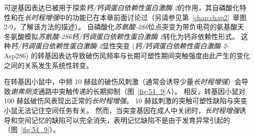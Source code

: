 可逆基因表达已被用于探索\textit{钙/钙调蛋白依赖性蛋白激酶 2}的作用，其自磷酸化特性和在\textit{长时程增强}中的功能已在本章前面讨论过（另请参见第~\ref{chap:chap2}~章图 2-9，了解该方法的描述）。
自磷酸化\textit{苏氨酸-286}位点突变为带负电荷的氨基酸天冬氨酸模拟\textit{苏氨酸-286}\textit{钙/钙调蛋白依赖性蛋白激酶 2}转化为钙非依赖性形式。
这种\textit{钙/钙调蛋白依赖性蛋白激酶 2}显性突变 (\textit{钙/钙调蛋白依赖性蛋白激酶 2}-Asp286) 的转基因表达导致破伤风频率与长期可塑性期间突触强度由此产生的变化之间的关系发生系统性转变。


在转基因小鼠中，中频 10 赫兹的破伤风刺激（通常会诱导少量\textit{长时程增强}）会导致\textit{谢弗侧支}通路中突触传递的长期抑制（图~\ref{fig:54_9}A）。
相反，转基因小鼠对 100 赫兹破伤风表现出正常的\textit{长时程增强}。
10 赫兹刺激的突触可塑性缺陷与突变小鼠无法记住空间任务有关。
然而，当突变基因在成人中关闭时，\textit{长时程增强}诱导和空间记忆的缺陷可以完全消失，表明记忆缺陷不是由于发育异常引起的（图~\ref{fig:54_9}）。


